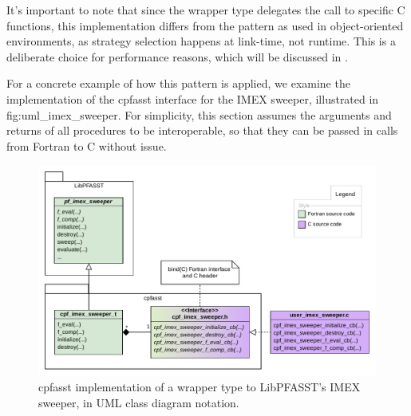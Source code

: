 It's important to note that since the wrapper type delegates the call to specific C functions, this implementation differs from the pattern as used in object-oriented environments, as strategy selection happens at link-time, not runtime. This is a deliberate choice for performance reasons, which will be discussed in .

For a concrete example of how this pattern is applied, we examine the implementation of the cpfasst interface for the IMEX sweeper, illustrated in 
{fig:uml_imex_sweeper}. For simplicity, this section assumes the arguments and returns of all procedures to be interoperable, so that they can be passed in calls from Fortran to C without issue.

\begin{figure}[ht]
  \centering
  \includegraphics[width=\textwidth]{images/uml_imex_sweeper.pdf}
  \caption{cpfasst implementation of a wrapper type to LibPFASST's IMEX sweeper, in UML class diagram notation.}
  \label{fig:uml_imex_sweeper}
\end{figure}

